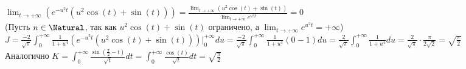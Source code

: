 \begin{enumerate}
        $\displaystyle \lim_{t \to +\infty} (e^{-u^2t}(u^2\cos(t) + \sin(t))) = 
            \frac{\lim_{t \to +\infty} (u^2\cos(t) + \sin(t))}{\lim_{t \to +\infty} e^{u^2t}} = 0
        $\\
        (Пусть $n \in \Natural$, так как $u^2\cos(t) + \sin(t)$ ограничено, а $\displaystyle \lim_{t \to +\infty} e^{u^2t} = +\infty$) \\
        $\displaystyle J = \frac{-2}{\sqrt{\pi}} \int_0^{+\infty} \frac{1}{1 + u^4} (e^{-u^2t}(u^2\cos(t) + \sin(t)))\Big|_0^{+\infty} du =
            \frac{-2}{\sqrt{\pi}} \int_0^{+\infty} \frac{1}{1 + u^4} (0 - 1) du =
            \frac{2}{\sqrt{\pi}} \int_0^{+\infty} \frac{1}{1 + u^4} du =
            \frac{2}{\sqrt{\pi}} \cdot \frac{\pi}{2\sqrt{2}} =
            \sqrt{\frac{\pi}{2}}
        $ \\
        Аналогично $K = \int_0^{+\infty} \frac{\sin\left(\frac{\pi}{2} - t\right)}{\sqrt{t}} dt = \int_0^{+\infty} \frac{\cos\left(t\right)}{\sqrt{t}} dt = \sqrt{\frac{\pi}{2}}$ \\


\end{enumerate}
